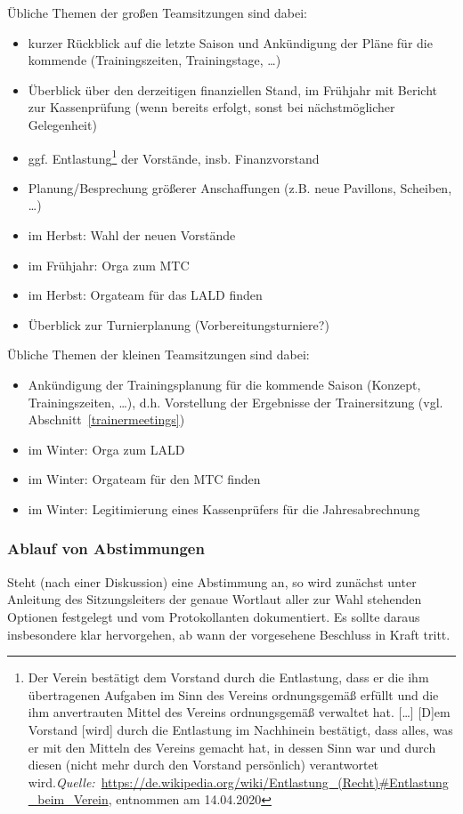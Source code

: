 \documentclass[a4 paper, 11pt]{article}
\begin{document}
Übliche Themen der großen Teamsitzungen sind dabei:
\begin{itemize}
	\item kurzer Rückblick auf die letzte Saison und Ankündigung der Pläne für die kommende (Trainingszeiten, Trainingstage, \dots)
	\item Überblick über den derzeitigen finanziellen Stand, im Frühjahr mit Bericht zur Kassenprüfung (wenn bereits erfolgt, sonst bei nächstmöglicher Gelegenheit)
	\item ggf. Entlastung\footnote{Der Verein bestätigt dem Vorstand durch die Entlastung, dass er die ihm übertragenen Aufgaben im Sinn des Vereins ordnungsgemäß erfüllt und die ihm anvertrauten Mittel des Vereins ordnungsgemäß verwaltet hat. [\dots] [D]em Vorstand [wird] durch die Entlastung im Nachhinein bestätigt, dass alles, was er mit den Mitteln des Vereins gemacht hat, in dessen Sinn war und durch diesen (nicht mehr durch den Vorstand persönlich) verantwortet wird.\linebreak \emph{Quelle:}~\url{https://de.wikipedia.org/wiki/Entlastung_(Recht)\#Entlastung_beim_Verein}, entnommen am 14.04.2020} der Vorstände, insb. Finanzvorstand
	\item Planung/Besprechung größerer Anschaffungen (z.B. neue Pavillons, Scheiben, \dots)
	\item im Herbst: Wahl der neuen Vorstände 
	\item im Frühjahr: Orga zum MTC
	\item im Herbst: Orgateam für das LALD finden
	\item Überblick zur Turnierplanung (Vorbereitungsturniere?)
\end{itemize}
\vspace{0.3cm}
Übliche Themen der kleinen Teamsitzungen sind dabei:
\begin{itemize}	
	\item Ankündigung der Trainingsplanung für die kommende Saison (Konzept, Trainingszeiten, \dots), d.h. Vorstellung der Ergebnisse der Trainersitzung (vgl. Abschnitt~\ref{trainermeetings})
	\item im Winter: Orga zum LALD	
	\item im Winter: Orgateam für den MTC finden
	\item im Winter: Legitimierung eines Kassenprüfers für die Jahresabrechnung
\end{itemize}

\subsubsection{Ablauf von Abstimmungen} \label{stimmberechtigung}
Steht (nach einer Diskussion) eine Abstimmung an, so wird zunächst unter Anleitung des Sitzungsleiters der genaue Wortlaut aller zur Wahl stehenden Optionen festgelegt und vom Protokollanten dokumentiert. Es sollte daraus insbesondere klar hervorgehen, ab wann der vorgesehene Beschluss in Kraft tritt. 
\end{document}
